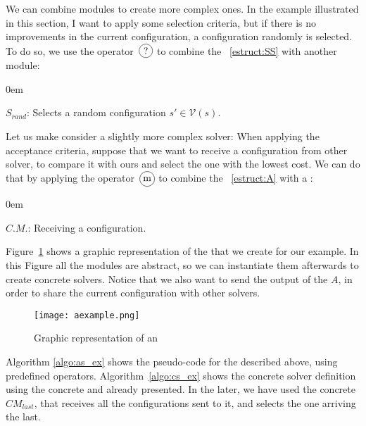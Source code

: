 We can combine modules to create more complex ones. In the example illustrated in this section, I want to apply some selection criteria, but if there is no improvements in the current configuration, a configuration randomly is selected. To do so, we use the operator~$\circled{?}$ to combine the \om{}~\ref{estruct:SS} with another module:

\begin{list}{}{} \itemsep0em  
	\item $S_{rand}$: Selects a random configuration $s' \in \mathcal{V}\left(s\right)$.
\end{list}

Let us make consider a slightly more complex solver: When applying the acceptance criteria, suppose that we want to receive a configuration from other solver, to compare it with ours and select the one with the lowest cost. We can do that by applying the operator~$\circled{m}$ to combine the \om{}~\ref{estruct:A} with a \opch:

\begin{list}{}{} \itemsep0em
	\item $C.M.$: Receiving a configuration.\label{struct:opch}
\end{list}

Figure~\ref{fig:as_ex} shows a graphic representation of the \as{} that we create for our example. In this Figure all the modules are abstract, so we can instantiate them afterwards to create concrete solvers. Notice that we also want to send the output of the \om{} $A$, in order to share the current configuration with other solvers.

\begin{figure}[h]
	\centering	
	\texttt{[image: aexample.png]}
	\caption{Graphic representation of an \as}\label{fig:as_ex}
\end{figure}

Algorithm \ref{algo:as_ex} shows the \posl{} pseudo-code for the \as{} described above, using predefined operators. Algorithm~\ref{algo:cs_ex} shows the concrete solver definition using the concrete \omprefix{} and \opchs{} already presented. In the later, we have used the concrete \opch{} $CM_{last}$, that receives all the configurations sent to it, and selects the one arriving the last.

